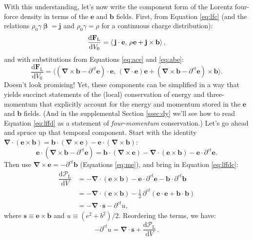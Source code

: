 \documentclass[12pt]{article}
\renewcommand{\vv}[1]{\mathbf{#1}}
\newcommand{\dd}[1]{\mathrm{d}#1}
\newcommand{\vvbeta}{\bm{\upbeta}}
\newcommand{\del}{\boldsymbol{\nabla}}
\begin{document}
With this understanding, let's now write the component form of the Lorentz four-force density in terms of the $\vv e$ and $\vv b$ fields. First, from Equation \ref{eq:lfc} (and the relations $\rho_0 \gamma \vvbeta = \vv j$ and $\rho_0 \gamma = \rho$ for a continuous charge distribution):
\begin{equation*}
\dfrac{\dd \vv F_{\mathrm{L}}}{\dd V_0} = \left \langle \, \vv j \cdot \vv e, \, \rho \mkern1mu \vv e + \vv j \times \vv b \right \rangle ,
\end{equation*}
and with substitutions from Equations \ref{eq:ace} and \ref{eq:abe}:
\begin{equation}\label{eq:lffdc2}
\dfrac{\dd \vv F_{\mathrm{L}}}{\dd V_0} = \Big \langle \left( \del \times \vv b - \partial^{ct} \vv e \right) \cdot \vv e , \, \left( \del \cdot \vv e \right) \vv e + \left( \del \times \vv b - \partial^{ct} \vv e \right) \times \vv b \Big \rangle .
\end{equation}
Doesn't look promising! Yet, these components can be simplified in a way that yields succinct statements of the (local) conservation of energy and three-momentum that explicitly account for the energy and momentum stored in the $\vv e$ and $\vv b$ fields. (And in the supplemental Section \ref{ssec:dy} we'll see how to read Equation \ref{eq:lffd} as a statement of \emph{four-momentum} conservation.) Let's go ahead and spruce up that temporal component. Start with the identity $\del \cdot (\vv e \times \vv b) = \vv b \cdot (\del \times \vv e) - \vv e \cdot (\del \times \vv b)$:
\begin{equation*}
\vv e \cdot \left( \del \times \vv b - \partial^{ct} \vv e \right) = \vv b \cdot \left( \del \times \vv e \right) - \del \cdot \left( \vv e \times \vv b \right) - \vv e \cdot \partial^{ct} \vv e .
\end{equation*}
Then use $\del \times \vv e = - \partial^{ct} \vv b$ (Equations \ref{eq:me}), and bring in Equation \ref{eq:lffdc}:
\begin{equation*}
\begin{split}
\dfrac{\dd \mathcal{P}_{\textrm{L}}}{\dd V} &= - \del \cdot \left( \vv e \times \vv b \right) - \vv e \cdot \partial^{ct} \vv e - \vv b \cdot \partial^{ct} \vv b  \\
&= - \del \cdot \left( \vv e \times \vv b \right) - \frac{1}{2} \, \partial^{ct} \left( \vv e \cdot \vv e + \vv b \cdot \vv b \right) \\[2pt]
&= - \del \cdot \vv s - \partial^{ct} u ,
\end{split}
\end{equation*}
where $\vv s \equiv \vv e \times \vv b$ and $u \equiv (e^2 + b^2)/2$. Reordering the terms, we have:
\begin{equation}\label{eq:py}
\boxed{ - \partial^{ct} u =  \del \cdot \vv s + \dfrac{\dd \mathcal{P}_{\textrm{L}}}{\dd V} } \, .
\end{equation}
\end{document}
